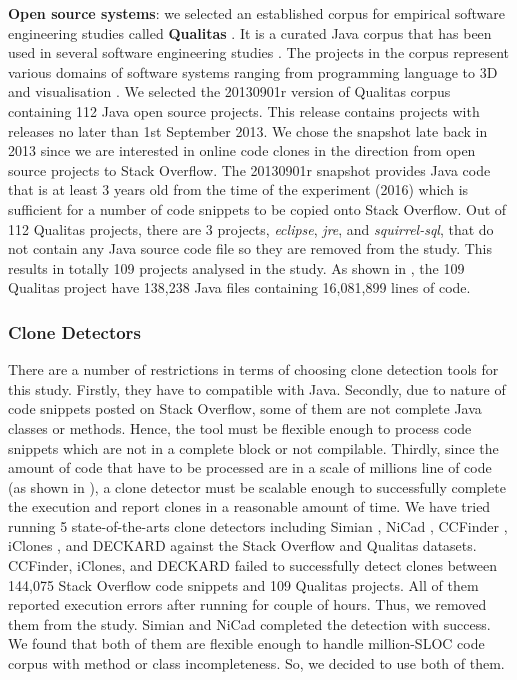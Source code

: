 \documentclass{sig-alternate-05-2015}
\begin{document}
\textbf{Open source systems}: we selected an established corpus for empirical software engineering studies called \textbf{Qualitas} \cite{QualitasCorpus}. It is a curated Java corpus that has been used in several software engineering studies \cite{Taube-Schock2011,Beckman2011,Vasilescu2011,Omar2012}. The projects in the corpus represent various domains of software systems ranging from programming language to 3D and visualisation \cite{QualitasCorpus}. We selected the 20130901r version of Qualitas corpus containing 112 Java open source projects. This release contains projects with releases no later than 1st September 2013. We chose the snapshot late back in 2013 since we are interested in online code clones in the direction from open source projects to Stack Overflow. The 20130901r snapshot provides Java code that is at least 3 years old from the time of the experiment (2016) which is sufficient for a number of code snippets to be copied onto Stack Overflow. Out of 112 Qualitas projects, there are 3 projects, \textit{eclipse}, \textit{jre}, and \textit{squirrel-sql}, that do not contain any Java source code file so they are removed from the study. This results in totally 109 projects analysed in the study. As shown in , the 109 Qualitas project have 138,238 Java files containing 16,081,899 lines of code. %

\subsubsection{Clone Detectors}
There are a number of restrictions in terms of choosing clone detection tools for this study. Firstly, they have to compatible with Java. Secondly, due to nature of code snippets posted on Stack Overflow, some of them are not complete Java classes or methods. Hence, the tool must be flexible enough to process code snippets which are not in a complete block or not compilable. Thirdly, since the amount of code that have to be processed are in a scale of millions line of code (as shown in ), a clone detector must be scalable enough to successfully complete the execution and report clones in a reasonable amount of time. We have tried running 5 state-of-the-arts clone detectors including Simian \cite{simian}, NiCad \cite{Cordy,Roy2008}, CCFinder \cite{Kamiya2002}, iClones \cite{Gode2009}, and DECKARD \cite{Jiang2007a} against the Stack Overflow and Qualitas datasets. CCFinder, iClones, and DECKARD failed to successfully detect clones between 144,075 Stack Overflow code snippets and 109 Qualitas projects. All of them reported execution errors after running for couple of hours. Thus, we removed them from the study. Simian and NiCad completed the detection with success. We found that both of them are flexible enough to handle million-SLOC code corpus with method or class incompleteness. So, we decided to use both of them.
\end{document}
